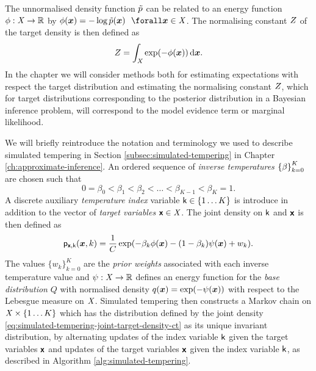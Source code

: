 The unnormalised density function $\tilde{p}$ can be related to an energy function $\phi : \mathit{X} \to \mathbb{R}$ by $\phi(\vct{x}) = -\log\utgtdens(\vct{x}) ~~\forall \vct{x} \in \set{X}$. The normalising constant $Z$ of the target density is then defined as
\begin{equation}
  \normconst = \int_{\set{X}} \exp\lpa -\phi(\vct{x})\rpa \,\dr\vct{x}.
\end{equation}
In the chapter we will consider methods both for estimating expectations with respect the target distribution and estimating the normalising constant $Z$, which for target distributions corresponding to the posterior distribution in a Bayesian inference problem, will correspond to the model evidence term or marginal likelihood.

We will briefly reintroduce the notation and terminology we used to describe simulated tempering in Section \ref{subsec:simulated-tempering} in Chapter \ref{ch:approximate-inference}. An ordered sequence of \emph{inverse temperatures} $\lbr \beta \rbr_{k=0}^K$ are chosen such that
\begin{equation}\label{eq:inverse-temperature-ordered-sequence}
  0 = \beta_0 < \beta_1 < \beta_2 < \dots < \beta_{K-1} < \beta_K = 1.
\end{equation}
A discrete auxiliary \emph{temperature index} variable $\rvar{k} \in \fset{1 \dots K}$ is introduce in addition to the vector of \emph{target variables} $\boldsymbol{\mathsf{x}} \in \mathit{X}$. The joint density on $\mathsf{k}$ and $\boldsymbol{\mathsf{x}}$ is then defined as
\begin{equation}\label{eq:simulated-tempering-joint-target-density-ct}
  \pden{\rvct{x},\rvar{k}}(\vct{x},k) = \frac{1}{C}
  \exp\lpa - \beta_k \phi(\vct{x}) - (1 - \beta_k) \psi(\vct{x}) + w_k\rpa.
\end{equation}
The values $\lbrace w_k \rbrace_{k=0}^K$ are the \emph{prior weights} associated with each inverse temperature value and $\psi : \mathit{X} \to \mathbb{R}$ defines an energy function for the \emph{base distribution} $Q$ with normalised density $q(\vct{x}) = \exp\lpa-\psi(\vct{x})\rpa$ with respect to the Lebesgue measure on $\mathit{X}$. Simulated tempering then constructs a Markov chain on $\set{X} \times \fset{1 \dots K}$ which has the distribution defined by the joint density \eqref{eq:simulated-tempering-joint-target-density-ct} as its unique invariant distribution, by alternating updates of the index variable $\mathsf{k}$ given the target variables $\boldsymbol{\mathsf{x}}$ and updates of the target variables $\boldsymbol{\mathsf{x}}$ given the index variable $\mathsf{k}$, as described in Algorithm \ref{alg:simulated-tempering}.

